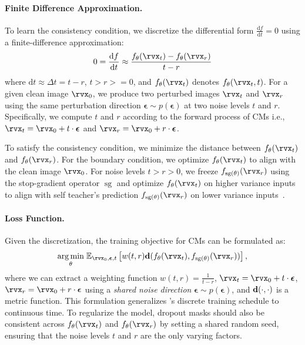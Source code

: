 \documentclass{article}
\begin{document}
\paragraph{Finite Difference Approximation.}
To learn the consistency condition, we discretize the differential form $\frac{\mathrm{d}f}{\mathrm{d}t} = 0$ using a finite-difference approximation:
\begin{equation}
0 = \frac{\mathrm{d}f}{\mathrm{d}t} \approx \frac{f_\theta(\x_t) - f_\theta(\x_r)}{t - r} 
\end{equation}
where $\mathrm{d}t \approx \Delta t = t - r$, $t > r >= 0$, and $f_\theta(\x_t)$ denotes $f_\theta(\x_t, t)$. 
For a given clean image $\x_0$, we produce two perturbed images $\x_t$ and $\x_r$ using the same perturbation direction $\boldsymbol{\epsilon} \sim p(\boldsymbol{\epsilon})$ at two noise levels $t$ and $r$.
Specifically,
we compute $t$ and $r$ according to the forward process of CMs i.e., $\x_t = \x_0 + t \cdot \boldsymbol{\epsilon}$ and $\x_r = \x_0 + r \cdot \boldsymbol{\epsilon}$.

To satisfy the consistency condition, we minimize the distance between $f_\theta(\x_t)$ and $f_\theta(\x_r)$. For the boundary condition, we optimize $f_\theta(\x_t)$ to align with the clean image $\x_0$. For noise levels $t > r > 0$, we freeze $f_{\operatorname{sg}(\theta)}(\x_r)$ using the stop-gradient operator $\operatorname{sg}$ and optimize $f_\theta(\x_t)$ on higher variance inputs to align with self teacher's prediction $f_{\operatorname{sg}(\theta)}(\x_r)$ on lower variance inputs~\citep{chen2021exploring}.
%
%
\paragraph{Loss Function.} Given the discretization, the training objective for CMs can be formulated as:
\begin{equation}\label{eq:CMcost}
\underset{\theta}{\arg \min} \; \mathbb{E}_{\x_0,\boldsymbol{\epsilon},t}\left[w(t, r)\dist(f_\theta(\x_t), f_{\operatorname{sg}(\theta)}(\x_r))
\right],
\end{equation}
%
%
where we can extract a weighting function $w(t, r) = \frac{1}{t-r}$, $\x_t = \x_0 + t \cdot \boldsymbol{\epsilon}$, $\x_r = \x_0 + r \cdot \boldsymbol{\epsilon}$ using a \textit{shared noise direction} $\boldsymbol{\epsilon} \sim p(\boldsymbol{\epsilon})$, and ${\mathbf{d}}(\cdot, \cdot)$ is a metric function.
%
This formulation generalizes \citet{cm}'s discrete training schedule to continuous time.
To regularize the model, dropout masks should also be consistent across $f_\theta(\x_t)$ and $f_\theta(\x_r)$ by setting a shared random seed, ensuring that the noise levels $t$ and $r$ are the only varying factors.
\end{document}
